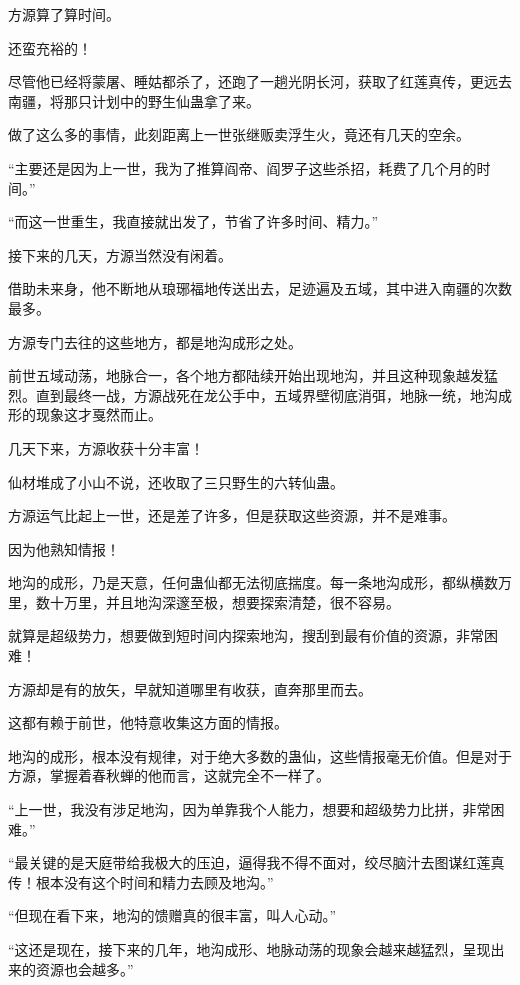 
\begin{this_body}

方源算了算时间。

还蛮充裕的！

尽管他已经将蒙屠、睡姑都杀了，还跑了一趟光阴长河，获取了红莲真传，更远去南疆，将那只计划中的野生仙蛊拿了来。

做了这么多的事情，此刻距离上一世张继贩卖浮生火，竟还有几天的空余。

“主要还是因为上一世，我为了推算阎帝、阎罗子这些杀招，耗费了几个月的时间。”

“而这一世重生，我直接就出发了，节省了许多时间、精力。”

接下来的几天，方源当然没有闲着。

借助未来身，他不断地从琅琊福地传送出去，足迹遍及五域，其中进入南疆的次数最多。

方源专门去往的这些地方，都是地沟成形之处。

前世五域动荡，地脉合一，各个地方都陆续开始出现地沟，并且这种现象越发猛烈。直到最终一战，方源战死在龙公手中，五域界壁彻底消弭，地脉一统，地沟成形的现象这才戛然而止。

几天下来，方源收获十分丰富！

仙材堆成了小山不说，还收取了三只野生的六转仙蛊。

方源运气比起上一世，还是差了许多，但是获取这些资源，并不是难事。

因为他熟知情报！

地沟的成形，乃是天意，任何蛊仙都无法彻底揣度。每一条地沟成形，都纵横数万里，数十万里，并且地沟深邃至极，想要探索清楚，很不容易。

就算是超级势力，想要做到短时间内探索地沟，搜刮到最有价值的资源，非常困难！

方源却是有的放矢，早就知道哪里有收获，直奔那里而去。

这都有赖于前世，他特意收集这方面的情报。

地沟的成形，根本没有规律，对于绝大多数的蛊仙，这些情报毫无价值。但是对于方源，掌握着春秋蝉的他而言，这就完全不一样了。

“上一世，我没有涉足地沟，因为单靠我个人能力，想要和超级势力比拼，非常困难。”

“最关键的是天庭带给我极大的压迫，逼得我不得不面对，绞尽脑汁去图谋红莲真传！根本没有这个时间和精力去顾及地沟。”

“但现在看下来，地沟的馈赠真的很丰富，叫人心动。”

“这还是现在，接下来的几年，地沟成形、地脉动荡的现象会越来越猛烈，呈现出来的资源也会越多。”


\end{this_body}
